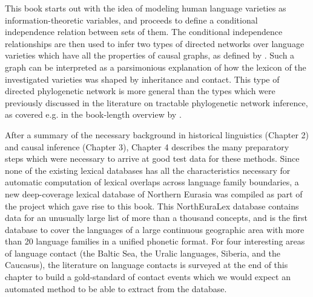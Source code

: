 \addchap{\lsPrefaceTitle}
 
 This book starts out with the idea of modeling human language varieties as information-theoretic variables, and proceeds to define a conditional independence relation between sets of them. The conditional independence relationships are then used to infer two types of directed networks over language varieties which have all the properties of causal graphs, as defined by \cite{pearl2009}. Such a graph can be interpreted as a parsimonious explanation of how the lexicon of the investigated varieties was shaped by inheritance and contact. This type of directed phylogenetic network is more general than the types which were previously discussed in the literature on tractable phylogenetic network inference, as covered e.g. in the book-length overview by \cite{morrison2011}.

After a summary of the necessary background in historical linguistics (Chapter 2) and causal inference (Chapter 3), Chapter 4 describes the many preparatory steps which were necessary to arrive at good test data for these methods. Since none of the existing lexical databases has all the characteristics necessary for automatic computation of lexical overlaps across language family boundaries, a new deep-coverage lexical database of Northern Eurasia was compiled as part of the project which gave rise to this book. This NorthEuraLex database contains data for an unusually large list of more than a thousand concepts, and is the first database to cover the languages of a large continuous geographic area with more than 20 language families in a unified phonetic format. For four interesting areas of language contact (the Baltic Sea, the Uralic languages, Siberia, and the Caucasus), the literature on language contacts is surveyed at the end of this chapter to build a gold-standard of contact events which we would expect an automated method to be able to extract from the database.

